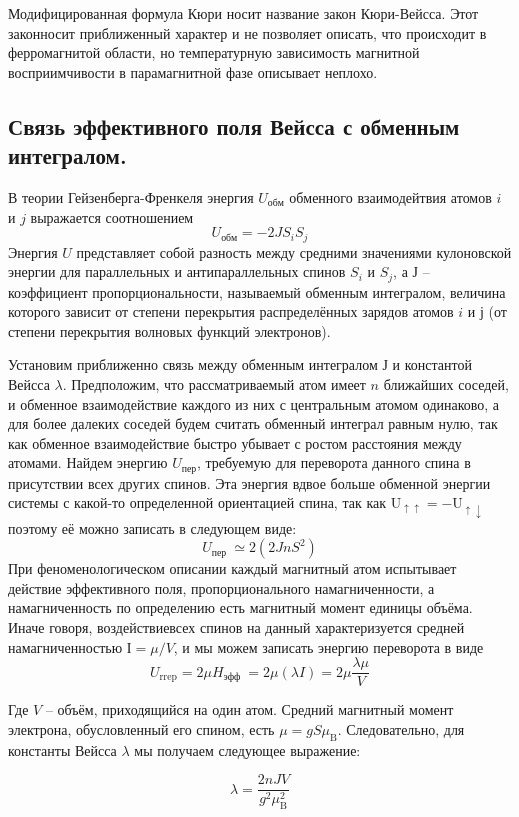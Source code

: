\documentclass[a4paper, 12pt]{article}%
\begin{document}
Модифицированная формула Кюри носит название закон Кюри-Вейсса. Этот законносит приближенный характер и не позволяет описать, что происходит в ферромагнитой области, но температурную зависимость магнитной восприимчивости в парамагнитной фазе описывает неплохо. 
\subsection{Связь эффективного поля Вейсса с обменным интегралом.}
В теории Гейзенберга-Френкеля энергия $U_\text{обм}$ обменного взаимодейтвия атомов $i$ и $j$ выражается соотношением
$$
U_\text{обм} = -2 J S_i S_j
$$
Энергия $U$ представляет собой разность между средними значениями кулоновской энергии для параллельных и антипараллельных спинов $S_i$ и $S_j$, а $Ј$ -- коэффициент пропорциональности, называемый обменным интегралом, величина которого зависит от
степени перекрытия распределённых зарядов атомов $i$ и $ј$ (от степени перекрытия
волновых функций электронов).

Установим приближенно связь между обменным интегралом $Ј$ и константой Вейсса $\lambda$. Предположим, что рассматриваемый атом имеет $n$ ближайших соседей, и обменное
взаимодействие каждого из них с центральным атомом одинаково, а для более далеких соседей будем считать обменный интеграл равным нулю, так как обменное взаимодействие быстро убывает с ростом расстояния между атомами. Найдем энергию $U_\text{пер}$, требуемую
для переворота данного спина в присутствии всех других спинов. Эта энергия вдвое больше обменной энергии системы с какой-то определенной ориентацией спина, так как $\mathrm{U}_{\uparrow \uparrow}=-\mathrm{U}_{\uparrow \downarrow}$ поэтому её можно записать в следующем виде:
$$
U_{\text {пер }} \simeq 2\left(2 J n S^{2}\right)
$$
При феноменологическом описании каждый магнитный атом испытывает действие
эффективного поля, пропорционального намагниченности, а намагниченность по
определению есть магнитный момент единицы объёма. Иначе говоря, воздействиевсех спинов на данный характеризуется средней намагниченностью $І=\mu/V$, и мы можем
записать энергию переворота в виде
$$
U_{\mathrm{rrep}}=2 \mu H_{\text {эфф }}=2 \mu(\lambda I)=2 \mu \frac{\lambda \mu}{V}
$$

Где $V$ -- объём, приходящийся на один атом. Средний магнитный момент электрона, обусловленный его спином, есть $\mu=g S \mu_{\text{B}}$. Следовательно, для константы Вейсса $\lambda$ мы получаем следующее выражение:

$$
\lambda=\frac{2 n J V}{g^{2} \mu_{\mathrm{B}}^{2}}
$$
\end{document}
